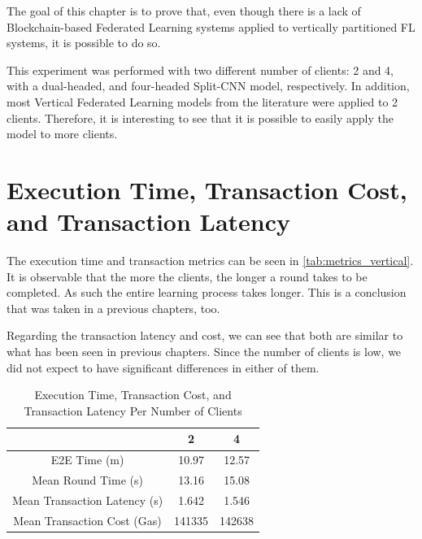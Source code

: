 The goal of this chapter is to prove that, even though there is a lack of Blockchain-based Federated Learning systems applied to vertically partitioned FL systems, it is possible to do so.

This experiment was performed with two different number of clients: 2 and 4, with a dual-headed, and four-headed Split-CNN model, respectively. In addition, most Vertical Federated Learning models from the literature were applied to 2 clients. Therefore, it is interesting to see that it is possible to easily apply the model to more clients.

\section{Execution Time, Transaction Cost, and Transaction Latency}

The execution time and transaction metrics can be seen in \autoref{tab:metrics_vertical}. It is observable that the more the clients, the longer a round takes to be completed. As such the entire learning process takes longer. This is a conclusion that was taken in a previous chapters, too.

Regarding the transaction latency and cost, we can see that both are similar to what has been seen in previous chapters. Since the number of clients is low, we did not expect to have significant differences in either of them.

\begin{table}[!ht]
\begin{tabular}{c|c|c} \hline \hline
                                & 2             & 4             \\ \hline \hline
E2E Time (m)                    & 10.97	        & 12.57         \\ \hline
Mean Round Time (s)             & 13.16	        & 15.08         \\ \hline
Mean Transaction Latency (s)    & 1.642	        & 1.546         \\ \hline
Mean Transaction Cost (Gas)     & 141335        & 142638        \\ \hline
\end{tabular}
\caption{Execution Time, Transaction Cost, and Transaction Latency Per Number of Clients}
\label{tab:metrics_vertical}
\end{table}

